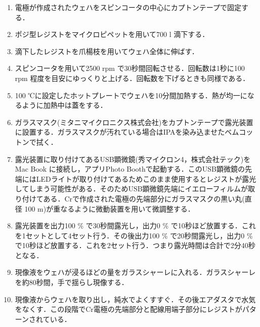 \begin{enumerate}
\item 電極が作成されたウェハをスピンコータの中心にカプトンテープで固定する．
\item ポジ型レジストをマイクロピペットを用いて700 \textmu l 滴下する．
\item 滴下したレジストを爪楊枝を用いてウェハ全体に伸ばす．
 
\item スピンコータを用いて2500 rpm で30秒間回転させる．回転数は1秒に100 rpm 程度を目安にゆっくりと上げる．回転数を下げるときも同様である．
\item 100 ℃に設定したホットプレートでウェハを10分間加熱する．熱が均一になるように加熱中は蓋をする．
\item ガラスマスク(ミタニマイクロニクス株式会社)をカプトンテープで露光装置に設置する．ガラスマスクが汚れている場合はIPAを染み込ませたベムコットンで拭く．
\item 露光装置に取り付けてあるUSB顕微鏡(秀マイクロン4，株式会社テック)を Mac Book に接続し，アプリPhoto Boothで起動する．このUSB顕微鏡の先端にはLEDライトが取り付けてあるためこのまま使用するとレジストが露光してしまう可能性がある．そのためUSB顕微鏡先端にイエローフィルムが取り付けてある．Crで作成された電極の先端部分にガラスマスクの黒い丸(直径 100 \textmu m)が重なるように微動装置を用いて微調整する．




\item 露光装置を出力100 \% で30秒間露光し，出力0 \% で10秒ほど放置する．これを1セットとして4セット行う．その後出力100 \% で20秒間露光し，出力0 \% で10秒ほど放置する．これを2セット行う．つまり露光時間は合計で2分40秒となる．
\item 現像液をウェハが浸るほどの量をガラスシャーレに入れる．ガラスシャーレを約80秒間，手で揺らし現像する．
\item 現像液からウェハを取り出し，純水でよくすすぐ．その後エアダスタで水気をなくす．この段階でCr電極の先端部分と配線用端子部分にレジストがパターンされている．

\clearpage
\end{enumerate} 

